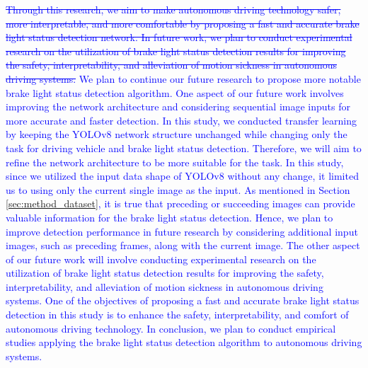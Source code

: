 \textcolor{blue}{
    \sout{Through this research, we aim to make autonomous driving technology safer, more interpretable, and more comfortable by proposing a fast and accurate brake light status detection network.
In future work, we plan to conduct experimental research on the utilization of brake light status detection results for improving the safety, interpretability, and alleviation of motion sickness in autonomous driving systems.
    }}
\textcolor{blue}{
We plan to continue our future research to propose more notable brake light status detection algorithm.
One aspect of our future work involves improving the network architecture and considering sequential image inputs for more accurate and faster detection.
In this study, we conducted transfer learning by keeping the YOLOv8 network structure unchanged while changing only the task for driving vehicle and brake light status detection.
Therefore, we will aim to refine the network architecture to be more suitable for the task.
In this study, since we utilized the input data shape of YOLOv8 without any change, it limited us to using only the current single image as the input. 
As mentioned in Section \ref{sec:method_dataset}, it is true that preceding or succeeding images can provide valuable information for the brake light status detection.
Hence, we plan to improve detection performance in future research by considering additional input images, such as preceding frames, along with the current image.
The other aspect of our future work will involve conducting experimental research on the utilization of brake light status detection results for improving the safety, interpretability, and alleviation of motion sickness in autonomous driving systems.
One of the objectives of proposing a fast and accurate brake light status detection in this study is to enhance the safety, interpretability, and comfort of autonomous driving technology.
In conclusion, we plan to conduct empirical studies applying the brake light status detection algorithm to autonomous driving systems.
}